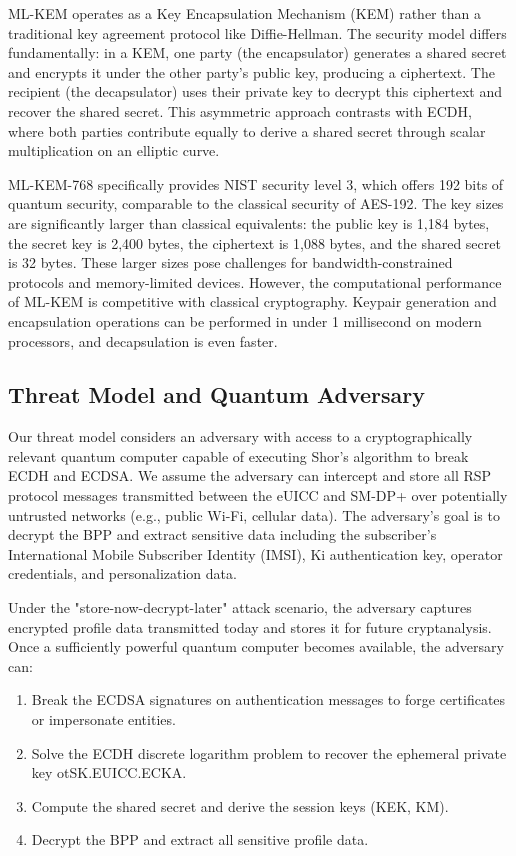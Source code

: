 \documentclass{easychair}
\begin{document}
ML-KEM operates as a Key Encapsulation Mechanism (KEM) rather than a traditional key agreement protocol like Diffie-Hellman. The security model differs fundamentally: in a KEM, one party (the encapsulator) generates a shared secret and encrypts it under the other party's public key, producing a ciphertext. The recipient (the decapsulator) uses their private key to decrypt this ciphertext and recover the shared secret. This asymmetric approach contrasts with ECDH, where both parties contribute equally to derive a shared secret through scalar multiplication on an elliptic curve.

ML-KEM-768 specifically provides NIST security level 3, which offers 192 bits of quantum security, comparable to the classical security of AES-192. The key sizes are significantly larger than classical equivalents: the public key is 1,184 bytes, the secret key is 2,400 bytes, the ciphertext is 1,088 bytes, and the shared secret is 32 bytes. These larger sizes pose challenges for bandwidth-constrained protocols and memory-limited devices. However, the computational performance of ML-KEM is competitive with classical cryptography. Keypair generation and encapsulation operations can be performed in under 1 millisecond on modern processors, and decapsulation is even faster.

\subsection{Threat Model and Quantum Adversary}

Our threat model considers an adversary with access to a cryptographically relevant quantum computer capable of executing Shor's algorithm to break ECDH and ECDSA. We assume the adversary can intercept and store all RSP protocol messages transmitted between the eUICC and SM-DP+ over potentially untrusted networks (e.g., public Wi-Fi, cellular data). The adversary's goal is to decrypt the BPP and extract sensitive data including the subscriber's International Mobile Subscriber Identity (IMSI), Ki authentication key, operator credentials, and personalization data.

Under the "store-now-decrypt-later" attack scenario, the adversary captures encrypted profile data transmitted today and stores it for future cryptanalysis. Once a sufficiently powerful quantum computer becomes available, the adversary can:

\begin{enumerate}
\item Break the ECDSA signatures on authentication messages to forge certificates or impersonate entities.
\item Solve the ECDH discrete logarithm problem to recover the ephemeral private key otSK.EUICC.ECKA.
\item Compute the shared secret and derive the session keys (KEK, KM).
\item Decrypt the BPP and extract all sensitive profile data.
\end{enumerate}
\end{document}
